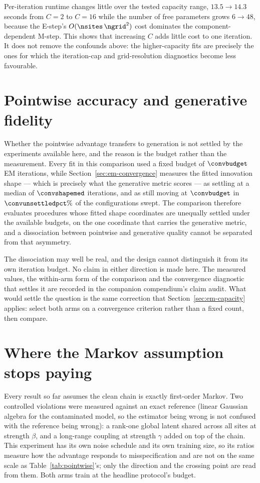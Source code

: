 Per-iteration runtime changes little over the tested capacity range,
$13.5\to14.3$ seconds from $C=2$ to $C=16$ while the number of free parameters
grows $6\to48$, because the E-step's $O(\nsites\,\ngrid^2)$ cost dominates the
component-dependent M-step. This shows that increasing $C$ adds little cost to
one iteration. It does not remove the confounds above: the higher-capacity fits
are precisely the ones for which the iteration-cap and grid-resolution
diagnostics become less favourable.

\section{Pointwise accuracy and generative fidelity}
\label{sec:em-generative}

Whether the pointwise advantage transfers to generation is not settled by
the experiments available here, and the reason is the budget rather than the
measurement. Every fit in this comparison used a fixed budget of $\convbudget$ EM
iterations, while Section~\ref{sec:em-convergence} measures the fitted
innovation shape --- which is precisely what the generative metric scores --- as
settling at a median of $\convshapemed$ iterations, and as still moving at
$\convbudget$ in $\convunsettledpct\%$ of the configurations swept. The
comparison therefore evaluates procedures whose fitted shape coordinates are
unequally settled under the available budgets, on the one coordinate that
carries the generative metric, and a dissociation between pointwise and
generative quality cannot be separated from that asymmetry.

The dissociation may well be real, and the design cannot distinguish it from
its own iteration budget. No claim in either direction is made here. The
measured values, the within-arm form of the comparison and the convergence
diagnostic that settles it are recorded in the companion compendium's claim
audit. What would settle the question is the same correction that
Section~\ref{sec:em-capacity} applies: select both arms on a convergence
criterion rather than a fixed count, then compare.

\section{Where the Markov assumption stops paying}\label{sec:em-nonmarkov}

Every result so far assumes the clean chain is exactly first-order Markov.
Two controlled violations were measured against an exact reference (linear
Gaussian algebra for the contaminated model, so the estimator being wrong is
not confused with the reference being wrong): a rank-one global latent
shared across all sites at strength $\beta$, and a long-range coupling at
strength $\gamma$ added on top of the chain. This experiment has its own noise
schedule and its own training size, so its ratios measure how the advantage
responds to misspecification and are not on the same scale as
Table~\ref{tab:pointwise}'s; only the direction and the crossing point are read
from them. Both arms train at the headline protocol's budget.


